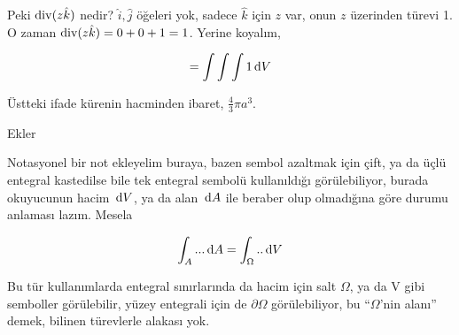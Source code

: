\documentclass[12pt,fleqn]{article}\usepackage{../../common}
\begin{document}
Peki $\operatorname{div} (z\hat{k})$ nedir? $\hat{i},\hat{j}$ öğeleri yok, sadece
$\hat{k}$ için $z$ var, onun $z$ üzerinden türevi 1. O zaman
$\operatorname{div} (z\hat{k}) = 0 + 0 + 1 = 1$. Yerine koyalım,

$$
= \int \int \int 1 \,\mathrm{d} V
$$

Üstteki ifade kürenin hacminden ibaret, $\frac{4}{3} \pi a^3$. 

Ekler

Notasyonel bir not ekleyelim buraya, bazen sembol azaltmak için çift, ya da üçlü
entegral kastedilse bile tek entegral sembolü kullanıldığı görülebiliyor, burada
okuyucunun hacim $\,\mathrm{d} V$, ya da alan $\,\mathrm{d} A$ ile beraber olup olmadığına göre
durumu anlaması lazım. Mesela

$$
\int_A ... \,\mathrm{d} A = \int_\Omega ..  \,\mathrm{d} V
$$


Bu tür kullanımlarda entegral sınırlarında da hacim için
salt $\Omega$, ya da V gibi semboller görülebilir, yüzey entegrali için de
$\partial \Omega$ görülebiliyor, bu ``$\Omega$'nin alanı'' demek, bilinen
türevlerle alakası yok.
\end{document}
